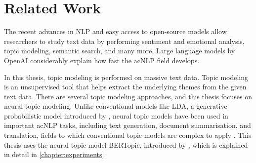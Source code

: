 
\chapter{Related Work}\label{chapter:related_work}

The recent advances in \ac{NLP} and easy access to open-source models allow researchers to 
study text data by performing sentiment and emotional analysis, topic modeling, 
semantic search, and many more. Large language models by OpenAI considerably 
explain how fast the ac{NLP} field develops.

In this thesis, topic modeling is performed on massive text data. Topic modeling is an 
unsupervised tool that helps extract the underlying themes from the given text data. 
There are several topic modeling approaches, and this thesis focuses on neural topic modeling. 
Unlike conventional models like \ac{LDA}, a generative probabilistic 
model introduced by \textcite{blei_lda_2003}, neural topic models have been used in important ac{NLP} 
tasks, including text generation, document summarisation, and translation, fields to 
which conventional topic models are complex to apply \parencite{zhao_neural_topic_models_2021}.
This thesis uses the neural topic model BERTopic, introduced by \textcite{bertopic}, 
which is explained in detail in \autoref{chapter:experiments}.


